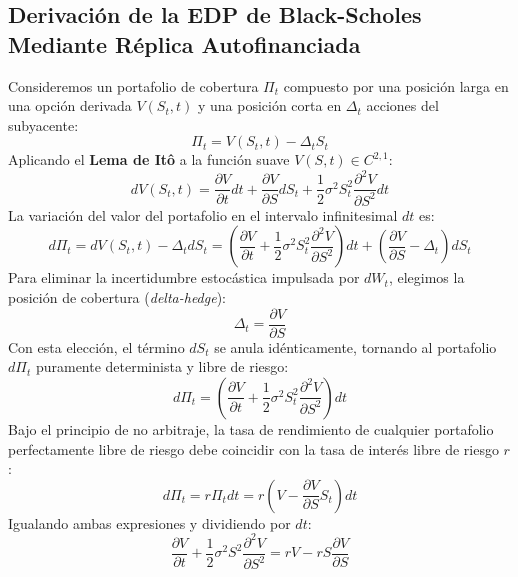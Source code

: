 \documentclass[11pt,a4paper]{article}
\begin{document}
\subsection{Derivación de la EDP de Black-Scholes Mediante Réplica Autofinanciada}
Consideremos un portafolio de cobertura $\Pi_t$ compuesto por una posición larga en una opción derivada $V(S_t, t)$ y una posición corta en $\Delta_t$ acciones del subyacente:
\begin{equation}
    \Pi_t = V(S_t, t) - \Delta_t S_t
\end{equation}
Aplicando el \textbf{Lema de Itô} a la función suave $V(S, t) \in C^{2,1}$:
\begin{equation}
    dV(S_t, t) = \frac{\partial V}{\partial t} dt + \frac{\partial V}{\partial S} dS_t + \frac{1}{2} \sigma^2 S_t^2 \frac{\partial^2 V}{\partial S^2} dt
\end{equation}
La variación del valor del portafolio en el intervalo infinitesimal $dt$ es:
\begin{equation}
    d\Pi_t = dV(S_t, t) - \Delta_t dS_t = \left( \frac{\partial V}{\partial t} + \frac{1}{2} \sigma^2 S_t^2 \frac{\partial^2 V}{\partial S^2} \right) dt + \left( \frac{\partial V}{\partial S} - \Delta_t \right) dS_t
\end{equation}
Para eliminar la incertidumbre estocástica impulsada por $dW_t$, elegimos la posición de cobertura (\textit{delta-hedge}):
\begin{equation}
    \Delta_t = \frac{\partial V}{\partial S}
\end{equation}
Con esta elección, el término $dS_t$ se anula idénticamente, tornando al portafolio $d\Pi_t$ puramente determinista y libre de riesgo:
\begin{equation}
    d\Pi_t = \left( \frac{\partial V}{\partial t} + \frac{1}{2} \sigma^2 S_t^2 \frac{\partial^2 V}{\partial S^2} \right) dt
\end{equation}
Bajo el principio de no arbitraje, la tasa de rendimiento de cualquier portafolio perfectamente libre de riesgo debe coincidir con la tasa de interés libre de riesgo $r$:
\begin{equation}
    d\Pi_t = r \Pi_t dt = r \left( V - \frac{\partial V}{\partial S} S_t \right) dt
\end{equation}
Igualando ambas expresiones y dividiendo por $dt$:
\begin{equation}
    \frac{\partial V}{\partial t} + \frac{1}{2} \sigma^2 S^2 \frac{\partial^2 V}{\partial S^2} = r V - r S \frac{\partial V}{\partial S}
\end{equation}
\end{document}
